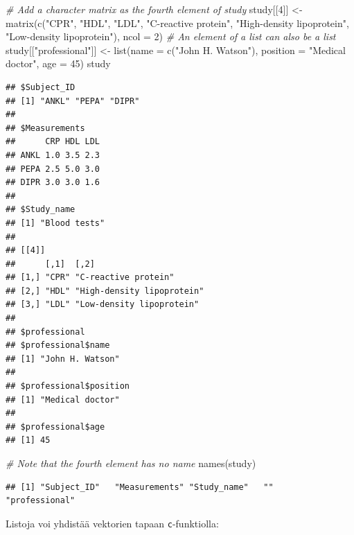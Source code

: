 \documentclass[
]{book}
\newenvironment{Shaded}{\begin{snugshade}}{\end{snugshade}}
\newcommand{\AttributeTok}[1]{\textcolor[rgb]{0.77,0.63,0.00}{#1}}
\newcommand{\CommentTok}[1]{\textcolor[rgb]{0.56,0.35,0.01}{\textit{#1}}}
\newcommand{\DecValTok}[1]{\textcolor[rgb]{0.00,0.00,0.81}{#1}}
\newcommand{\FunctionTok}[1]{\textcolor[rgb]{0.00,0.00,0.00}{#1}}
\newcommand{\NormalTok}[1]{#1}
\newcommand{\OtherTok}[1]{\textcolor[rgb]{0.56,0.35,0.01}{#1}}
\newcommand{\StringTok}[1]{\textcolor[rgb]{0.31,0.60,0.02}{#1}}
\begin{document}
\begin{Shaded}
\begin{Highlighting}[]
\CommentTok{\# Add a character matrix as the fourth element of study}
\NormalTok{study[[}\DecValTok{4}\NormalTok{]] }\OtherTok{\textless{}{-}} \FunctionTok{matrix}\NormalTok{(}\FunctionTok{c}\NormalTok{(}\StringTok{"CPR"}\NormalTok{, }\StringTok{"HDL"}\NormalTok{, }\StringTok{"LDL"}\NormalTok{,}
                       \StringTok{"C{-}reactive protein"}\NormalTok{, }\StringTok{"High{-}density lipoprotein"}\NormalTok{,}
                       \StringTok{"Low{-}density lipoprotein"}\NormalTok{),}
                     \AttributeTok{ncol =} \DecValTok{2}\NormalTok{)}
\CommentTok{\# An element of a list can also be a list}
\NormalTok{study[[}\StringTok{"professional"}\NormalTok{]] }\OtherTok{\textless{}{-}} \FunctionTok{list}\NormalTok{(}\AttributeTok{name =} \FunctionTok{c}\NormalTok{(}\StringTok{"John H. Watson"}\NormalTok{),}
                                \AttributeTok{position =} \StringTok{"Medical doctor"}\NormalTok{,}
                                \AttributeTok{age =} \DecValTok{45}\NormalTok{)}
\NormalTok{study}
\end{Highlighting}
\end{Shaded}

\begin{verbatim}
## $Subject_ID
## [1] "ANKL" "PEPA" "DIPR"
## 
## $Measurements
##      CRP HDL LDL
## ANKL 1.0 3.5 2.3
## PEPA 2.5 5.0 3.0
## DIPR 3.0 3.0 1.6
## 
## $Study_name
## [1] "Blood tests"
## 
## [[4]]
##      [,1]  [,2]                      
## [1,] "CPR" "C-reactive protein"      
## [2,] "HDL" "High-density lipoprotein"
## [3,] "LDL" "Low-density lipoprotein" 
## 
## $professional
## $professional$name
## [1] "John H. Watson"
## 
## $professional$position
## [1] "Medical doctor"
## 
## $professional$age
## [1] 45
\end{verbatim}

\begin{Shaded}
\begin{Highlighting}[]
\CommentTok{\# Note that the fourth element has no name}
\FunctionTok{names}\NormalTok{(study)}
\end{Highlighting}
\end{Shaded}

\begin{verbatim}
## [1] "Subject_ID"   "Measurements" "Study_name"   ""             "professional"
\end{verbatim}

Listoja voi yhdistää vektorien tapaan \texttt{c}-funktiolla:
\end{document}
